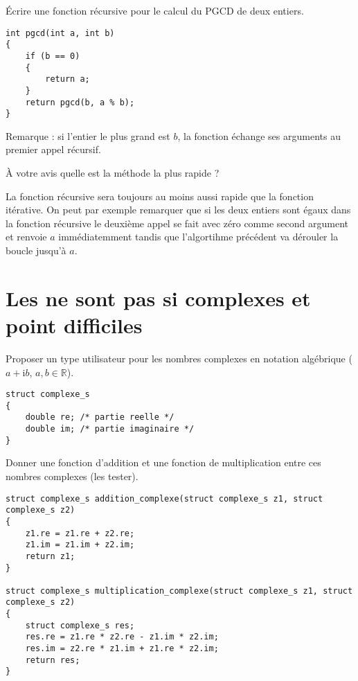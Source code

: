 \begin{newenu}
\begin{correction}
 \end{correction}
\item  Écrire une fonction récursive pour le calcul du PGCD de deux
  entiers.
  \begin{correction}
\begin{verbatim}
int pgcd(int a, int b)
{
    if (b == 0)
    {
        return a;
    }
    return pgcd(b, a % b);
}
\end{verbatim}
Remarque : si l'entier le plus grand est $b$, la fonction échange ses arguments au premier appel récursif.
  \end{correction}
\item À votre avis quelle est la méthode la plus rapide ?
  \begin{correction}
La fonction récursive sera toujours au moins aussi rapide que la fonction itérative. On peut par exemple remarquer que si les deux entiers sont égaux dans la fonction récursive le deuxième appel se fait avec zéro comme second argument et renvoie $a$ immédiatemment tandis que l'algortihme précédent va dérouler la boucle jusqu'à $a$.
  \end{correction}
\end{newenu}


\section{Les  ne sont pas si complexes et point difficiles}

\begin{lastenu}
\item Proposer un type utilisateur pour les nombres complexes en
  notation algébrique ($a + \mathrm{i} b$, $a,b\in\mathbb{R}$).

  \begin{correction}
\begin{verbatim}
struct complexe_s
{
    double re; /* partie reelle */
    double im; /* partie imaginaire */
}
\end{verbatim}
  \end{correction}

\item Donner une fonction d'addition et une fonction de multiplication
  entre ces nombres complexes (les tester).

  \begin{correction}
\begin{verbatim}
struct complexe_s addition_complexe(struct complexe_s z1, struct complexe_s z2)
{
    z1.re = z1.re + z2.re;
    z1.im = z1.im + z2.im;
    return z1;
}

struct complexe_s multiplication_complexe(struct complexe_s z1, struct complexe_s z2)
{
    struct complexe_s res;
    res.re = z1.re * z2.re - z1.im * z2.im;
    res.im = z2.re * z1.im + z1.re * z2.im;
    return res;
}
\end{verbatim}
  \end{correction}
\end{lastenu}

